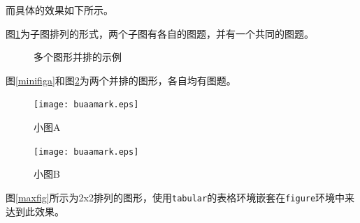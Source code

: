 而具体的效果如下所示。\par
图\ref{subfig1}为子图排列的形式，两个子图有各自的图题，并有一个共同的图题。\par
\begin{figure}[htb]
\begin{center}
	\hspace{7em}
	\caption{多个图形并排的示例}
	\label{subfig1}
\end{center}
\end{figure}
图\ref{minifiga}和图\ref{minifigb}为两个并排的图形，各自均有图题。\par
\begin{figure}[htb]
\begin{minipage}{0.5\textwidth}
	\centering
	\texttt{[image: buaamark.eps]}
	\caption{小图A}
	\label{minifiga}
\end{minipage}
\begin{minipage}{0.5\textwidth}
	\centering
	\texttt{[image: buaamark.eps]}
	\caption{小图B}
	\label{minifigb}
\end{minipage}
\end{figure}
图\ref{maxfig}所示为2x2排列的图形，使用\texttt{tabular}的表格环境嵌套在\texttt{figure}环境中来达到此效果。\par
